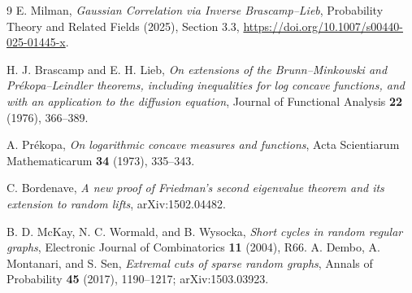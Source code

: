 \documentclass[10pt]{article}
\numberwithin{equation}{section}
\newcommand{\1}{\mathbf1}
\begin{document}
\begin{thebibliography}{9}
E. Milman,
\emph{Gaussian Correlation via Inverse Brascamp--Lieb},
Probability Theory and Related Fields (2025), Section 3.3,
\url{https://doi.org/10.1007/s00440-025-01445-x}.

H. J. Brascamp and E. H. Lieb,
\emph{On extensions of the Brunn--Minkowski and Pr\'ekopa--Leindler
 theorems, including inequalities for log concave functions, and with
 an application to the diffusion equation},
Journal of Functional Analysis \textbf{22} (1976), 366--389.

A. Pr\'ekopa,
\emph{On logarithmic concave measures and functions},
Acta Scientiarum Mathematicarum \textbf{34} (1973), 335--343.

C. Bordenave,
\emph{A new proof of Friedman's second eigenvalue theorem and its
extension to random lifts}, arXiv:1502.04482.

B. D. McKay, N. C. Wormald, and B. Wysocka,
\emph{Short cycles in random regular graphs},
Electronic Journal of Combinatorics \textbf{11} (2004), R66.
A. Dembo, A. Montanari, and S. Sen,
\emph{Extremal cuts of sparse random graphs},
Annals of Probability \textbf{45} (2017), 1190--1217;
arXiv:1503.03923.
\end{thebibliography}
\end{document}
